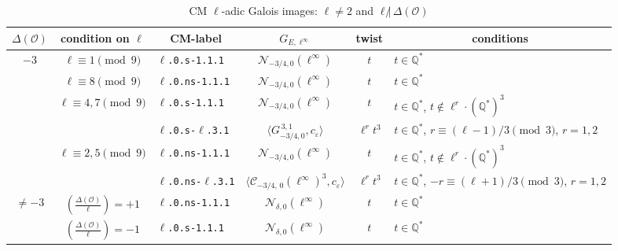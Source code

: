 \documentclass[11pt]{amsart}
\theoremstyle{definition}
\newcommand{\Q}{\mathbb Q}
\newcommand{\cC}{\mathcal{C}}
\begin{document}
{%

\renewcommand{\arraystretch}{1.5}
\begin{longtable}{|c|c|l|c|c|l|}
\caption{CM $\ell$-adic Galois images: $\ell \ne 2$ and $\ell \not| \, \Delta(\mathcal{O})$}\label{cmoddnotdividing}\label{tab-ellnotdividing}
\\ \hline
$\Delta(\mathcal O)$  & condition on $\ell$ & \multicolumn{1}{|c|}{CM-label}  & $G_{E,\ell^\infty}$ 
& twist  &  \multicolumn{1}{|c|}{conditions} \\  
\hline 
{$-3$}   & $\ell \equiv 1\pmod 9$  & \texttt{$\ell$.0.s-1.1.1} &  $\mathcal{N}_{-3/4,0}(\ell^{\infty})$ & $t$ & $t\in\Q^*$  \\ \cline{2-6} 
& $\ell\equiv 8\pmod 9$ & \texttt{$\ell$.0.ns-1.1.1} & $\mathcal{N}_{-3/4,0}(\ell^{\infty})$
& $t$ & $t\in\Q^*$ \\  \cline{2-6} 
& {$\ell \equiv 4,7\pmod 9$}  & \texttt{$\ell$.0.s-1.1.1} & $\mathcal{N}_{-3/4,0}(\ell^{\infty})$
& $t$ & $t\in\Q^*$, $t\not\in \ell^r\cdot (\Q^\ast)^3$ \\  \cline{3-6} 
&                                                              & \texttt{$\ell$.0.s-$\ell$.3.1} & $\langle G^{\, 3,1}_{-3/4,0}, c_{\varepsilon} \rangle$
& $\ell^r t^3$ & $t\in\Q^*$, $r\equiv (\ell-1)/3\pmod 3$, $r=1,2$\\  \cline{2-6}
& {$\ell \equiv 2,5\pmod 9$}  & \texttt{$\ell$.0.ns-1.1.1} & $\mathcal{N}_{-3/4,0}(\ell^{\infty})$
& $t$ & $t\in\Q^*$, $t\not\in \ell^r\cdot (\Q^\ast)^3$ \\  \cline{3-6} 
&                                                              & \texttt{$\ell$.0.ns-$\ell$.3.1} & $\langle \cC_{-3/4,\,0}(\ell^{\infty})^3, c_\varepsilon \rangle $
& $\ell^r t^3$ & $t\in\Q^*$, $-r\equiv (\ell+1)/3 \pmod 3$, $r=1,2$\\  \hline
 {$\ne -3$}  & $ \left(\frac{\Delta(\mathcal O)}{\ell}\right)=+1$  &  \texttt{$\ell$.0.ns-1.1.1} & $\mathcal{N}_{\delta, 0}(\ell^{\infty})$
 & $t$ & $t\in\Q^*$  \\ \cline{2-6}        
& $ \left(\frac{\Delta(\mathcal O)}{\ell}\right)=-1$  &  \texttt{$\ell$.0.s-1.1.1} & $\mathcal{N}_{\delta, 0}(\ell^{\infty})$
& $t$ & $t\in\Q^*$  \\ \hline                          
\end{longtable}

}


\end{document}
